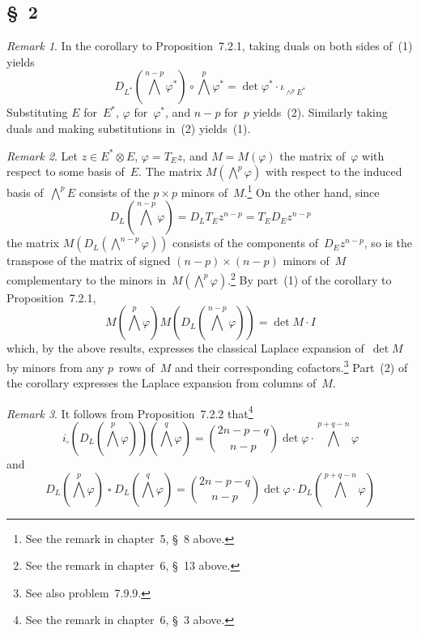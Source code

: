 \documentclass[letterpaper,12pt]{article}
\newcommand{\after}{\circ}
\newcommand{\mult}{\cdot}
\newcommand{\tprod}{\otimes}
\newcommand{\eprod}{\wedge}
\newcommand{\bigeprod}{\bigwedge}
\newcommand{\medeprod}{{\textstyle\bigeprod}}
\newcommand{\bprod}{\mathop{\square}}
\theoremstyle{definition}
\theoremstyle{remark}
\newtheorem*{rmk}{Remark}
\begin{document}
\subsection*{\S~2}
\begin{rmk}
In the corollary to Proposition~7.2.1, taking duals on both sides of~(1) yields
\[D_{L^*}(\medeprod^{n-p}\varphi^*)\after\medeprod^p\varphi^*=\det\varphi^*\mult\iota_{\eprod^p E^*}\]
Substituting \(E\) for~\(E^*\), \(\varphi\) for~\(\varphi^*\), and \(n-p\) for~\(p\) yields~(2). Similarly taking duals and making substitutions in~(2) yields~(1).
\end{rmk}

\begin{rmk}
Let \(z\in E^*\tprod E\), \(\varphi=T_Ez\), and \(M=M(\varphi)\) the matrix of~\(\varphi\) with respect to some basis of~\(E\). The matrix \(M(\medeprod^p\varphi)\) with respect to the induced basis of~\(\medeprod^p E\) consists of the \(p\times p\) minors of~\(M\).\footnote{See the remark in chapter~5, \S~8 above.} On the other hand, since
\[D_L(\medeprod^{n-p}\varphi)=D_LT_Ez^{n-p}=T_ED_Ez^{n-p}\]
the matrix \(M(D_L(\medeprod^{n-p}\varphi))\) consists of the components of~\(D_Ez^{n-p}\), so is the transpose of the matrix of signed \((n-p)\times(n-p)\) minors of~\(M\) complementary to the minors in~\(M(\medeprod^p\varphi)\).\footnote{See the remark in chapter~6, \S~13 above.} By part~(1) of the corollary to Proposition~7.2.1,
\[M(\medeprod^p\varphi)M(D_L(\medeprod^{n-p}\varphi))=\det M\mult I\]
which, by the above results, expresses the classical Laplace expansion of~\(\det M\) by minors from any \(p\)~rows of~\(M\) and their corresponding cofactors.\footnote{See also problem~7.9.9.} Part~(2) of the corollary expresses the Laplace expansion from columns of~\(M\).
\end{rmk}

\begin{rmk}
It follows from Proposition~7.2.2 that\footnote{See the remark in chapter~6, \S~3 above.}
\[i_{\bprod}(D_L(\medeprod^p\varphi))(\medeprod^q\varphi)=\binom{2n-p-q}{n-p}\det\varphi\mult\medeprod^{p+q-n}\varphi\tag{1}\]
and
\[D_L(\medeprod^p\varphi)\bprod D_L(\medeprod^q\varphi)=\binom{2n-p-q}{n-p}\det\varphi\mult D_L(\medeprod^{p+q-n}\varphi)\tag{2}\]
\end{rmk}
\end{document}
